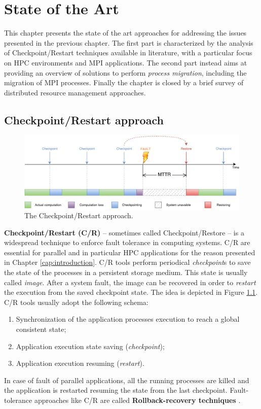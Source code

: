 \chapter{State of the Art}
\label{cap:state-of-the-art}
\iffalse
This chapter presents the state of the art approaches for addressing the
issues presented in the previous chapter. The first part is characterized
by the analysis of Checkpoint/Restart techniques available in literature,
with a particular focus on HPC environments and MPI
applications.
The second part instead aims at providing an overview of solutions to perform
\emph{process migration},
including the migration of MPI processes. Finally the chapter is closed by a
brief survey of distributed resource management approaches.

\section{Checkpoint/Restart approach}
\label{sec:CRApproach}

\begin{figure}[t]
		\centerline 
{\includegraphics[scale=0.55]{img/cap2-cr.pdf}}
		\caption[The Checkpoint/Restart approach]{The Checkpoint/Restart approach.}
		\label{fig:checkpointrestore}
\end{figure}

\textbf{Checkpoint/Restart (C/R)} -- sometimes called Checkpoint/Restore -- is a \linebreak
widespread technique to enforce fault tolerance in computing systems. C/R are
essential for parallel and in particular HPC applications for the reason
presented in Chapter \ref{cap:introduction}.
C/R tools perform periodical \emph{checkpoint}s to save the state of the 
processes in a persistent storage medium. This state is usually called \emph{image}.
After a system fault, the image can be recovered in
order to \emph{restart} the execution from the saved checkpoint state. The
idea is depicted in Figure \ref{fig:checkpointrestore}.
C/R tools usually adopt the following schema:
\begin{enumerate}
\item Synchronization of the application processes execution to
reach a global consistent state;
\item Application execution state saving (\emph{checkpoint}); 
\item Application execution resuming (\emph{restart}).
\end{enumerate}
In case of fault of parallel applications, all the running processes
are killed and the application is restarted resuming the state from the last
checkpoint. Fault-tolerance approaches like C/R are called
\textbf{Rollback-recovery techniques} \cite{elnozahy2002survey}.

